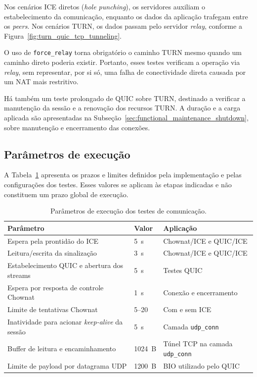 Nos cenários ICE diretos (\textit{hole punching}), os servidores auxiliam o estabelecimento da comunicação, enquanto os dados da aplicação trafegam entre os \textit{peers}. Nos cenários TURN, os dados passam pelo servidor \textit{relay}, conforme a Figura~\ref{fig:turn_quic_tcp_tunneling}.

O uso de \texttt{force\_relay} torna obrigatório o caminho TURN mesmo quando um caminho direto poderia existir. Portanto, esses testes verificam a operação via \textit{relay}, sem representar, por si só, uma falha de conectividade direta causada por um NAT mais restritivo. 

Há também um teste prolongado de QUIC sobre TURN, destinado a verificar a manutenção da sessão e a renovação dos recursos TURN. A duração e a carga aplicada são apresentadas na Subseção~\ref{sec:functional_maintenance_shutdown}, sobre manutenção e encerramento das conexões.

\subsection{Parâmetros de execução}

A Tabela~\ref{tab:experimental_parameters} apresenta os prazos e limites definidos pela implementação e pelas configurações dos testes. Esses valores se aplicam às etapas indicadas e não constituem um prazo global de execução.

\begin{table}[htbp]
    \centering
    \begin{tabular}{@{}p{}p{}p{}@{}}
        \toprule
        \textbf{Parâmetro} &
        \textbf{Valor} &
        \textbf{Aplicação} \\
        \midrule
        Espera pela prontidão do ICE &
        5~s & Chownat/ICE e QUIC/ICE \\
        Leitura/escrita da sinalização &
        3~s & Chownat/ICE e QUIC/ICE \\
        Estabelecimento QUIC e abertura dos streams &
        5~s & Testes QUIC \\
        Espera por resposta de controle Chownat &
        1~s & Conexão e encerramento \\
        Limite de tentativas Chownat &
        5--20 & Com e sem ICE \\
        Inatividade para acionar \textit{keep-alive}
        da sessão &
        5~s & Camada \texttt{udp\_conn} \\
        Buffer de leitura e encaminhamento &
        1024~B & Túnel TCP na camada \texttt{udp\_conn} \\
        Limite de payload por datagrama UDP &
        1200~B & BIO utilizado pelo QUIC \\
        \bottomrule
    \end{tabular}
    \caption{Parâmetros de execução dos testes de comunicação.}
    \label{tab:experimental_parameters}
\end{table}

